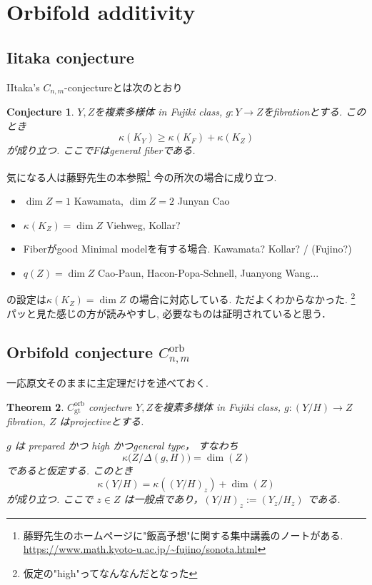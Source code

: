 \documentclass[dvipdfmx,a4paper,11pt]{article} %
\newtheorem{thm}{Theorem}[section]
\newtheorem{conj}[thm]{Conjecture}
\theoremstyle{definition}
\theoremstyle{remark}
\numberwithin{equation}{section}
\begin{document}
\section{Orbifold additivity}

\subsection{Iitaka conjecture}

IItaka's \(C_{n,m}\)-conjectureとは次のとおり
\begin{conj}\cite[Conjecture 4.1]{Cam04}
$Y, Z$を複素多様体 in Fujiki class,
\(g : Y\to Z\)をfibrationとする. 
このとき
\[
\kappa(K_Y) \ge \kappa(K_{F}) + \kappa(K_Z)
\]
が成り立つ.
ここで$F$はgeneral fiberである. 
\end{conj}

気になる人は藤野先生の本\cite{Fuj20}参照\footnote{藤野先生のホームページに"飯高予想"に関する集中講義のノートがある. \url{https://www.math.kyoto-u.ac.jp/~fujino/sonota.html}}
今の所次の場合に成り立つ.
\begin{itemize}
\item $\dim Z =1$ Kawamata, $\dim Z=2$ Junyan Cao
\item $\kappa(K_Z) =\dim Z$ Viehweg, Kollar?
\item Fiberがgood Minimal modelを有する場合. Kawamata? Kollar? / (Fujino?)
\item $q(Z)=\dim Z$ Cao-Paun, Hacon-Popa-Schnell, Juanyong Wang...
\end{itemize}

\cite{Cam04}の設定は$\kappa(K_Z) =\dim Z$ の場合に対応している. 
ただよくわからなかった. \footnote{仮定の"high"ってなんなんだとなった}
パッと見た感じ\cite{Wang21}の方が読みやすし, 必要なものは証明されていると思う． 

\subsection{Orbifold conjecture \(C_{n,m}^{\mathrm{orb}}\)}

一応原文そのままに主定理だけを述べておく. 

\begin{thm}{\cite[Theorem 4.2]{Cam04} \(C_{\mathrm{gt}}^{\mathrm{orb}}\) conjecture }
$Y, Z$を複素多様体 in Fujiki class,
\(g : (Y/H) \to Z\) fibration, \(Z\) はprojectiveとする. 

\(g\) は prepared かつ high かつgeneral type， すなわち
\[
\kappa\bigl(Z/\Delta(g,H)\bigr) = \dim(Z)
\]
であると仮定する.
このとき
\[
\kappa(Y/H) = \kappa((Y/H)_z) + \dim(Z)
\]
が成り立つ.
ここで \(z \in Z\) は一般点であり，\((Y/H)_z := (Y_z/H_z)\) である.
\end{thm}
\end{document}
